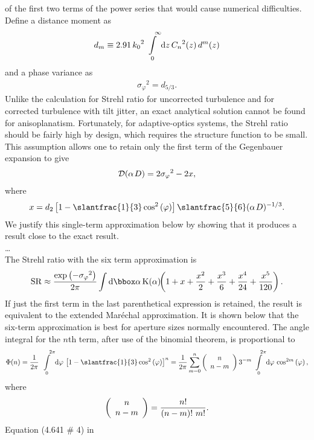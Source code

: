 of the first two terms of the power series that would cause
numerical difficulties.  Define a distance moment as
\begin{eqnarray}d_m\equiv  2.91\,{k_0}^2\int\limits_{\,\,\,
0}^{\,\,\,\,\,\,\infty}{\rm d}z\,{C_n}^2(z)\,d^m(z) \end{eqnarray}
and a phase variance as  \begin{eqnarray}{\sigma _\varphi}^2=d_{5/
3}.\end{eqnarray}    Unlike the calculation for Strehl ratio for
uncorrected  turbulence and for corrected turbulence with tilt
jitter, an exact  analytical solution cannot be found for
anisoplanatism.  Fortunately,  for adaptive-optics systems, the
Strehl ratio should be fairly high by  design, which requires the
structure function to be small.  This  assumption allows one to
retain only the first term of the Gegenbauer  expansion to give
\begin{eqnarray}{\cal D}(\alpha \kern  1ptD)=2{\sigma
_\varphi}^2-2x,\end{eqnarray} where
\begin{eqnarray}x=d_{2}\left[ {1-
{\textstyle{\slantfrac{1}{3}}}\cos ^2\left( \varphi  \right)}
\right]{\slantfrac{5}{6}}(\alpha \kern 1ptD)^{-1/ 3}.\end{eqnarray}
 We justify this single-term approximation below by showing that it
produces a result close to the exact result. \\      \ldots \\ The
Strehl ratio with the six term approximation is
\begin{eqnarray}{\rm   SR} \approx  {{\exp \left( {-\sigma
_\varphi} ^2 \right)} \over {2\pi }}\int {\rm d{\bbox  \alpha}
\,K(\alpha )\,}\kern-.5em\left( {1+x+{{x^2} \over 2}+{{x^3} \over 6}+{{x^4}
\over {24}}+{{x^5} \over {120}}} \right).\end{eqnarray}  If just
the  first term in the last parenthetical expression  is retained,
the result is equivalent to  the extended Mar\'{e}chal
approximation.  It is shown below that the six-term  approximation
is best for aperture sizes normally encountered.   The angle
integral for the $n$th term, after use of the binomial theorem,  is
proportional to  \begin{eqnarray}\Phi (n)={1 \over {2\pi
}}\int\limits_{\,\,\, 0}^{\,\,\,\,\,\,\,\, 2\pi } {\rm d}\varphi \,\left[
{1-\slantfrac{1}{3}} \cos ^2\left( \varphi  \right) \right]^n={1
\over {2\pi  }}\sum\limits_{m=0}^n {\left( \begin{array}{c} n \\
n-m\end{array}  \right)}\,3^{-m}\int\limits_{\,\,\, 0}^{\,\,\,\,\,\, 2\pi
} {\rm d\varphi }\, \cos ^{2m}\left( \varphi
\right),\end{eqnarray}  where       \begin{eqnarray}\left(
\begin{array}{c} n \\ n-m \end{array} \right)={{n!} \over {\left(
{n-m} \right)!\,\,m!}}.\end{eqnarray}  Equation (4.641 \# 4) in
